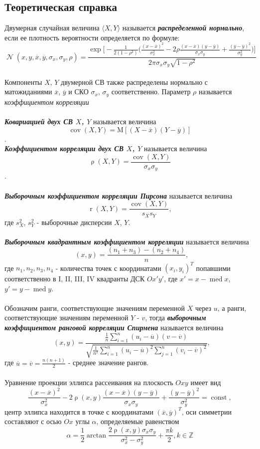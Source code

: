 \documentclass[14pt]{extarticle}
\DeclareMathOperator{\cov}{cov} %
\DeclareMathOperator{\med}{med} %
\DeclareMathOperator{\corr}{\rho} %
\DeclareMathOperator{\pirs}{r} %
\DeclareMathOperator{\const}{const} %
\DeclareMathOperator{\normal}{\mathcal{N}} %
\DeclareMathOperator{\qdrnt}{r_Q} %
\DeclareMathOperator{\spir}{r_S} %
\begin{document}
\subsection{Теоретическая справка}
Двумерная случайная величина \(\langle X, Y\rangle\) называется \textbf{\textit{распределенной нормально}}, если ее плотность вероятности определяется по формуле:\\ 
\[\normal(x,  y, \overline{x}, \overline{y}, \sigma_x, \sigma_y, \rho)=\frac{\exp\bigg[-\frac{1}{2(1-\rho^2)}\Big(\frac{(x-\overline{x})^2}{\sigma_x^2}-2\rho\frac{(x-\overline{x})(y-\overline{y})}{\sigma_x\sigma_y}+\frac{(y-\overline{y})^2}{\sigma_y^2}\Big)\bigg]}{2\pi\sigma_x\sigma_y\sqrt{1-\rho^2}}\]\\
Компоненты \(X\), \(Y\) двумерной СВ также распределены нормально с матожиданиями \(\overline{x}\), \(\overline{y}\) и СКО \(\sigma_x\), \(\sigma_y\) соответственно. Параметр \(\rho\) называется \textit{коэффициентом корреляции}\\\\
\textbf{\textit{Ковариацией двух СВ \(X\), \(Y\)}} называется величина \[\cov{(X,Y)}=\mathrm{M}[(X-\overline{x})(Y-\overline{y})]\].\\
\textbf{\textit{Коэффициентом корреляции двух СВ \(X\), \(Y\)}} называется величина \[\corr{(X, Y)}=\frac{\cov{(X, Y)}}{\sigma_x\sigma_y}\].\\\\
\textbf{\textit{Выборочным коэффициентом корреляции Пирсона}} называется величина \[\pirs{(X, Y)}=\frac{\cov{(X, Y)}}{s_Xs_Y},\]
где \(s_X^2\), \(s_Y^2\) - выборочные дисперсии \(X\), \(Y\).\\\\
\textbf{\textit{Выборочным квадрантным коэффициентом корреляции}} называется величина \[\qdrnt{(x, y)}=\frac{(n_1+n_3)-(n_2+n_4)}{n},\] где \(n_1, n_2, n_3, n_4\) - количества точек с координатами \((x_i, y_i)^T\) попавшими соответственно в I, II, III, IV квадранты ДСК \(Ox'y'\), где \(x'=x-\med{x}\), \(y'=y-\med{y}\).\\\\
Обозначим ранги, соответствующие значениям переменной \(X\) через \(u\), а ранги, соответствующие значениям переменной \(Y\) - \(v\), тогда \textbf{\textit{выборочным коэффициентом ранговой корреляции Спирмена}} называется величина \[\spir{(x, y)} = \frac{\frac{1}{n}\sum\limits_{i=1}^{n} (u_i-\overline{u})(v-\overline{v})}{\sqrt{\frac{1}{n^2}\sum\limits_{i=1}^{n}(u_i-\overline{u})^2\sum\limits_{j=1}^{n}(v_i-\overline{v})^2}},\] где \(\overline{u}=\overline{v}=\frac{n(n+1)}{2}\) - среднее значение рангов.\\\\
Уравнение проекции эллипса рассеивания на плоскость \(Oxy\) имеет вид \[\frac{(x-\overline{x})^2}{\sigma_x^2}-2\corr{(x,y)}\frac{(x-\overline{x})(y-\overline{y})}{\sigma_x\sigma_y}+\frac{(y-\overline{y})^2}{\sigma_y^2}=\const,\] центр эллипса находится в точке с координатами \((\overline{x}, \overline{y})^T\), оси симметрии составляют с осью \(Ox\) углы \(\alpha\), определяемые равенством \[\alpha=\frac{1}{2}\arctan{\frac{2\corr{(x, y)\sigma_x\sigma_y}}{\sigma_x^2-\sigma_y^2}}+\frac{\pi k}{2}, k\in\mathbb{Z}\]
\end{document}
